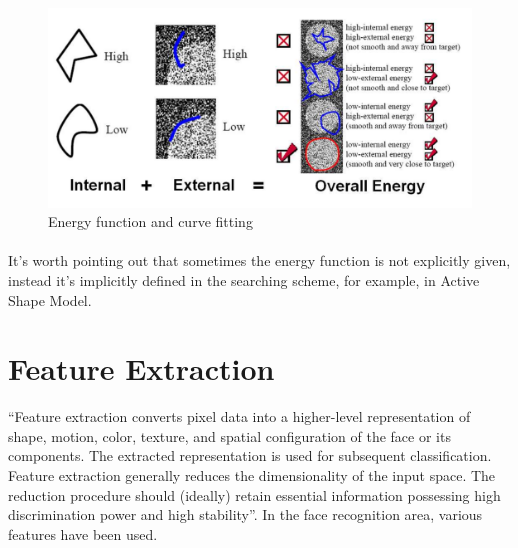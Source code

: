 \documentclass[12pt]{report}
\begin{document}
\begin{figure}[h!]
    \centering
  \includegraphics[width=\textwidth]{../img/18_1.png}     
      \caption{Energy function and curve fitting}
    \label{fig:face}
\end{figure}

\paragraph{}
It’s worth pointing out that sometimes the energy function is not explicitly given, instead it’s implicitly defined in the searching scheme, for example, in Active Shape Model.

\section{Feature Extraction}
“Feature extraction converts pixel data into a higher-level representation of shape, motion, color, texture, and spatial configuration of the face or its components. The extracted representation is used for subsequent classification. Feature extraction generally reduces the dimensionality of the input space. The reduction procedure should (ideally) retain essential information possessing high discrimination power and high stability”. In the face recognition area, various features have been used.
\end{document}
